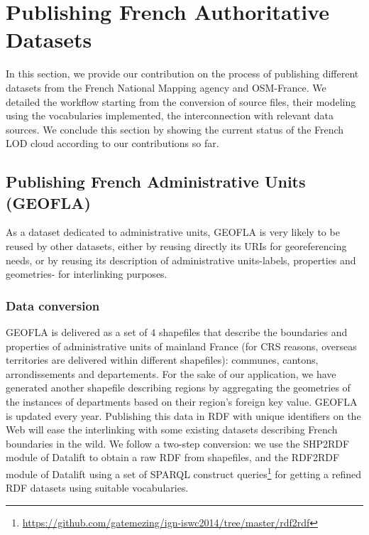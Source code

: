 \section{Publishing French Authoritative Datasets} \label{sec:publishing}
In this section, we provide our contribution on the process of publishing different datasets from the French National Mapping agency and OSM-France. We detailed the workflow starting from the conversion of source files, their modeling using the vocabularies implemented, the interconnection with relevant data sources. We conclude this section by showing the current status of the French LOD cloud according to our contributions so far.

\subsection{Publishing French Administrative Units (GEOFLA)} \label{sec:geofla}
As a dataset dedicated to administrative units, GEOFLA is very likely to be reused by other datasets, either by reusing directly its URIs for georeferencing needs, or by reusing its description of administrative units-labels, properties and geometries- for interlinking purposes.

\subsubsection{Data conversion}
\label{sec:dconversion}
GEOFLA  is delivered as a set of 4 shapefiles  that describe the boundaries and properties of administrative units of mainland France (for CRS reasons, overseas territories are delivered within different shapefiles): communes, cantons, arrondissements and departements. For the sake of our application, we have generated another shapefile describing regions by aggregating the geometries of the instances of departments based on their region's foreign key value. GEOFLA is updated every year.  Publishing this data in RDF with unique identifiers on the Web will ease the interlinking with some existing datasets describing French boundaries in the wild. We follow a two-step conversion: we use the SHP2RDF module of Datalift to obtain a raw RDF from shapefiles, and the RDF2RDF module of Datalift  using a set of SPARQL construct queries\footnote{ \url{https://github.com/gatemezing/ign-iswc2014/tree/master/rdf2rdf}} for getting a refined RDF datasets using suitable vocabularies.

